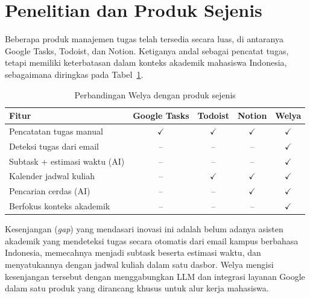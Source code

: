 \section{Penelitian dan Produk Sejenis}
Beberapa produk manajemen tugas telah tersedia secara luas, di antaranya
Google Tasks, Todoist, dan Notion. Ketiganya andal sebagai pencatat tugas,
tetapi memiliki keterbatasan dalam konteks akademik mahasiswa Indonesia,
sebagaimana diringkas pada Tabel~\ref{tab:perbandingan}.

\begin{table}[htbp]
  \centering
  \caption{Perbandingan Welya dengan produk sejenis}
  \label{tab:perbandingan}
  \small
  \begin{tabular}{@{}p{4.2cm}cccc@{}}
    \toprule
    Fitur & Google Tasks & Todoist & Notion & Welya \\
    \midrule
    Pencatatan tugas manual        & $\checkmark$ & $\checkmark$ & $\checkmark$ & $\checkmark$ \\
    Deteksi tugas dari email       & --           & --           & --           & $\checkmark$ \\
    Subtask + estimasi waktu (AI)  & --           & --           & --           & $\checkmark$ \\
    Kalender jadwal kuliah         & --           & $\checkmark$ & $\checkmark$ & $\checkmark$ \\
    Pencarian cerdas (AI)          & --           & --           & $\checkmark$ & $\checkmark$ \\
    Berfokus konteks akademik      & --           & --           & --           & $\checkmark$ \\
    \bottomrule
  \end{tabular}
\end{table}

Kesenjangan (\emph{gap}) yang mendasari inovasi ini adalah belum adanya
asisten akademik yang mendeteksi tugas secara otomatis dari email kampus
berbahasa Indonesia, memecahnya menjadi subtask beserta estimasi waktu,
dan menyatukannya dengan jadwal kuliah dalam satu dasbor. Welya mengisi
kesenjangan tersebut dengan menggabungkan LLM dan integrasi layanan
Google dalam satu produk yang dirancang khusus untuk alur kerja
mahasiswa.
